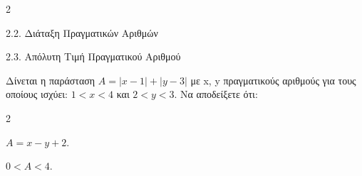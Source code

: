 \begin{ylh}{2}
    \item 2.2. Διάταξη Πραγματικών Αριθμών
    \item 2.3. Απόλυτη Τιμή Πραγματικού Αριθμού
\end{ylh}
Δίνεται η παράσταση $A = |x - 1| + |y - 3|$ με x, y πραγματικούς αριθμούς για τους οποίους ισχύει: $1 < x < 4$ και $2 < y < 3$. Να αποδείξετε ότι:
\begin{multicols}{2}
\begin{alist}
\item $A = x - y + 2$.
\item $0 < A < 4$.
\end{alist}
\end{multicols}

